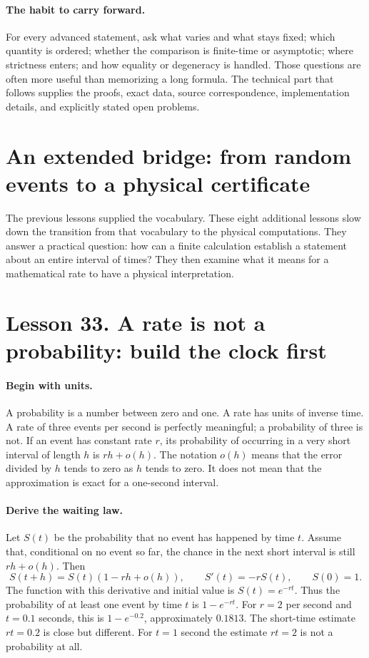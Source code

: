 \documentclass[11pt]{article}
\begin{document}
\paragraph{The habit to carry forward.}
For every advanced statement, ask what varies and what stays fixed; which
quantity is ordered; whether the comparison is finite-time or asymptotic;
where strictness enters; and how equality or degeneracy is handled.
Those questions are often more useful than memorizing a long formula.
The technical part that follows supplies the proofs, exact data, source
correspondence, implementation details, and explicitly stated open problems.

\clearpage
\section*{An extended bridge: from random events to a physical certificate}
The previous lessons supplied the vocabulary. These eight additional lessons
slow down the transition from that vocabulary to the physical computations.
They answer a practical question: how can a finite calculation establish a
statement about an entire interval of times? They then examine what it means
for a mathematical rate to have a physical interpretation.

\section*{Lesson 33. A rate is not a probability: build the clock first}
\paragraph{Begin with units.}
A probability is a number between zero and one. A rate has units of inverse
time. A rate of three events per second is perfectly meaningful; a probability
of three is not. If an event has constant rate $r$, its probability of occurring
in a very short interval of length $h$ is $rh+o(h)$. The notation $o(h)$ means
that the error divided by $h$ tends to zero as $h$ tends to zero. It does not
mean that the approximation is exact for a one-second interval.

\paragraph{Derive the waiting law.}
Let $S(t)$ be the probability that no event has happened by time $t$.
Assume that, conditional on no event so far, the chance in the next short
interval is still $rh+o(h)$. Then
\[
 S(t+h)=S(t)(1-rh+o(h)),\qquad S'(t)=-rS(t),\qquad S(0)=1.
\]
The function with this derivative and initial value is $S(t)=e^{-rt}$.
Thus the probability of at least one event by time $t$ is $1-e^{-rt}$.
For $r=2$ per second and $t=0.1$ seconds, this is $1-e^{-0.2}$,
approximately $0.1813$. The short-time estimate $rt=0.2$ is close but different.
For $t=1$ second the estimate $rt=2$ is not a probability at all.
\end{document}
